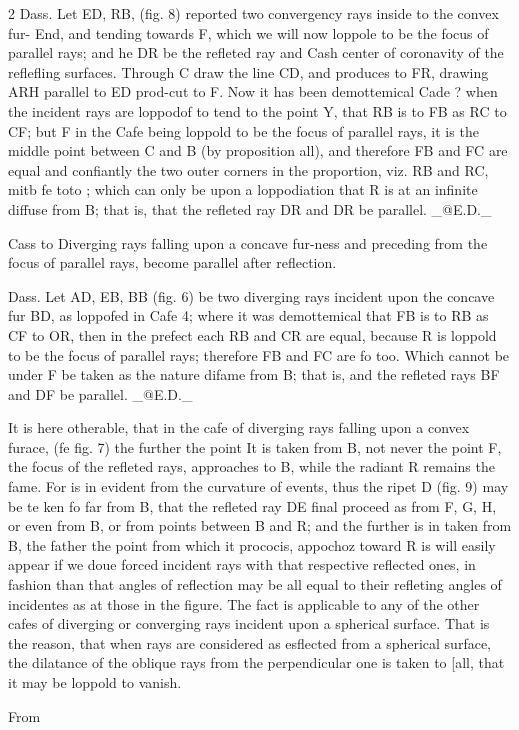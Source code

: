 \documentclass[10pt]{article}
\begin{document}
\begin{multicols}{2}
Dass. Let ED, RB, (fig. 8) reported two convergency rays inside to the convex fur- End, and tending towards F, which we will now loppole to be the focus of parallel rays; and he DR be the refleted ray and Cash center of coronavity of the reflefling surfaces. Through C draw the line CD, and produces to FR, drawing ARH parallel to ED prod-cut to F. Now it has been demottemical Cade ? when the incident rays are loppodof to tend to the point Y, that RB is to FB as RC to CF; but F in the Cafe being loppold to be the focus of parallel rays, it is the middle point between C and B (by proposition all), and therefore FB and FC are equal and confiantly the two outer corners in the proportion, viz. RB and RC, mitb fe toto ; which can only be upon a loppodiation that R is at an infinite diffuse from B; that is, that the refleted ray DR and DR be parallel. \_@E.D.\_

Cass to Diverging rays falling upon a concave fur-ness and preceding from the focus of parallel rays, become parallel after reflection.

Dass. Let AD, EB, BB (fig. 6) be two diverging rays incident upon the concave fur BD, as loppofed in Cafe 4; where it was demottemical that FB is to RB as CF to OR, then in the prefect each RB and CR are equal, because R is loppold to be the focus of parallel rays; therefore FB and FC are fo too. Which cannot be under F be taken as the nature difame from B; that is, and the refleted rays BF and DF be parallel. \_@E.D.\_

It is here otherable, that in the cafe of diverging rays falling upon a convex furace, (fe fig. 7) the further the point It is taken from B, not never the point F, the focus of the refleted rays, approaches to B, while the radiant R remains the fame. For is in evident from the curvature of events, thus the ripet D (fig. 9) may be te ken fo far from B, that the refleted ray DE final proceed as from F, G, H, or even from B, or from points between B and R; and the further is in taken from B, the father the point from which it prococis, appochoz toward R is will easily appear if we doue forced incident rays with that respective reflected ones, in fashion than that angles of reflection may be all equal to their refleting angles of incidentes as at those in the figure. The fact is applicable to any of the other cafes of diverging or converging rays incident upon a spherical surface. That is the reason, that when rays are considered as esflected from a spherical surface, the dilatance of the oblique rays from the perpendicular one is taken to [all, that it may be loppold to vanish.

From

\end{multicols}
\end{document}
